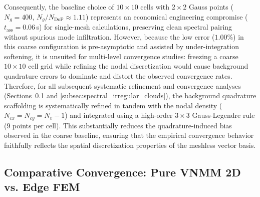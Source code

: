 \documentclass[preprint,12pt]{elsarticle}
\begin{document}
Consequently, the baseline choice of $10 \times 10$ cells with $2 \times 2$ Gauss points ($N_g = 400$, $N_g / N_{\mathrm{DoF}} \approx 1.11$) represents an economical engineering compromise ($t_{\mathrm{ass}} = 0.06$\,s) for single-mesh calculations, preserving clean spectral pairing without spurious mode infiltration. However, because the low error ($1.00\%$) in this coarse configuration is pre-asymptotic and assisted by under-integration softening, it is unsuited for multi-level convergence studies: freezing a coarse $10 \times 10$ cell grid while refining the nodal discretization would cause background quadrature errors to dominate and distort the observed convergence rates. Therefore, for all subsequent systematic refinement and convergence analyses (Sections~\ref{subsec:convergence_comparison} and \ref{subsec:spectral_irregular_clouds}), the background quadrature scaffolding is systematically refined in tandem with the nodal density ($N_{cx} = N_{cy} = N_v - 1$) and integrated using a high-order $3 \times 3$ Gauss-Legendre rule ($9$ points per cell). This substantially reduces the quadrature-induced bias observed in the coarse baseline, ensuring that the empirical convergence behavior faithfully reflects the spatial discretization properties of the meshless vector basis.

\subsection{Comparative Convergence: Pure VNMM 2D vs. Edge FEM}
\label{subsec:convergence_comparison}
\end{document}
